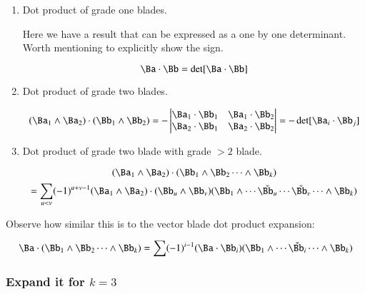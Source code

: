 \begin{enumerate}
\item Dot product of grade one blades.

Here we have a result that can be expressed as a one by one determinant.  Worth mentioning to explicitly show the sign.

\begin{equation}\label{eqn:bladegradereduction:dotoneblades}
\Ba \cdot \Bb = \det[\Ba \cdot \Bb]
\end{equation}

\item Dot product of grade two blades.

\begin{equation}\label{eqn:bladegradereduction:k2k2dot}
(\Ba_1 \wedge \Ba_2) \cdot (\Bb_1 \wedge \Bb_2)
=
-
\begin{vmatrix}
\Ba_1 \cdot \Bb_1 & \Ba_1 \cdot \Bb_2 \\
\Ba_2 \cdot \Bb_1 & \Ba_2 \cdot \Bb_2 \\
\end{vmatrix}
=
-\det[\Ba_i \cdot \Bb_j]
\end{equation}

\item Dot product of grade two blade with grade $>2$ blade.

\begin{equation*}
(\Ba_{1} \wedge \Ba_2) \cdot (\Bb_1 \wedge \Bb_2 \cdots \wedge \Bb_k)
\end{equation*}
\begin{equation}\label{eqn:bladegradereduction:bivectordot}
= 
\sum_{u<v} (-1)^{u+v-1} 
(\Ba_1 \wedge \Ba_2) \cdot (\Bb_u \wedge \Bb_v)
(\Bb_1 \wedge \cdots \check{\Bb_u} \cdots \check{\Bb_v} \cdots \wedge \Bb_k) 
\end{equation}
\end{enumerate}

Observe how similar this is to the vector blade dot product expansion:

\begin{equation}\label{eqn:bladegradereduction:vectordot}
\Ba \cdot (\Bb_1 \wedge \Bb_2 \cdots \wedge \Bb_k)
= 
\sum (-1)^{i-1} 
(\Ba \cdot \Bb_i) (\Bb_1 \wedge \cdots \check{\Bb_i} \cdots \wedge \Bb_k) 
\end{equation}

\subsubsection{Expand it for $k=3$ }

